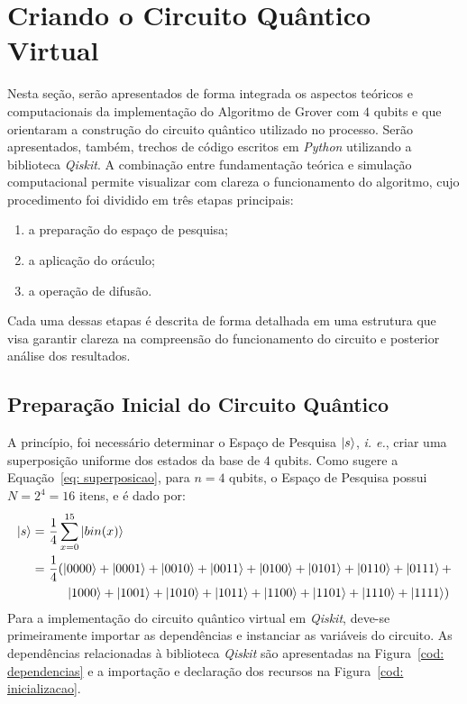 \section{Criando o Circuito Quântico Virtual}
\label{sec: circuitoVirtual}

Nesta seção, serão apresentados de forma integrada os aspectos teóricos e computacionais da implementação do Algoritmo de Grover com $4$ qubits e que orientaram a construção do circuito quântico utilizado no processo. Serão apresentados, também, trechos de código escritos em \emph{Python} utilizando a biblioteca \emph{Qiskit}. A combinação entre fundamentação teórica e simulação computacional permite visualizar com clareza o funcionamento do algoritmo, cujo procedimento foi dividido em três etapas principais:
\begin{enumerate}
    \item a preparação do espaço de pesquisa;
    \item a aplicação do oráculo;
    \item a operação de difusão.
\end{enumerate}

Cada uma dessas etapas é descrita de forma detalhada em uma estrutura que visa garantir clareza na compreensão do funcionamento do circuito e posterior análise dos resultados.

\subsection{Preparação Inicial do Circuito Quântico}
\label{subSec: preparacaoInicialTeo}

A princípio, foi necessário determinar o Espaço de Pesquisa $\ket{s}$, \emph{i. e.}, criar uma superposição uniforme dos estados da base de $4$ qubits. Como sugere a Equação~\ref{eq: superposicao}, para $n=4$ qubits, o Espaço de Pesquisa possui $N = 2^4 = 16$ itens, e é dado por:
%
\begin{align}
    \label{eq: espacoPesquisa}
    \notag
    \ket{s} =&~ \frac{1}{4} \sum_{x=0}^{15} \ket{bin(x)} \\
     =&~ \frac{1}{4} (\ket{0000} +  \ket{0001} +  \ket{0010} +  \ket{0011} +  \ket{0100} +  \ket{0101} +  \ket{0110} + \ket{0111} +  \\
    \notag{}
     &~~~~~\ket{1000} +  \ket{1001} +  \ket{1010} +  \ket{1011} +  \ket{1100} +  \ket{1101} +  \ket{1110} +  \ket{1111})
\end{align}
%
\tab\tab Para a implementação do circuito quântico virtual em \emph{Qiskit}, deve-se primeiramente importar as dependências e instanciar as variáveis do circuito. As dependências relacionadas à biblioteca \emph{Qiskit} são apresentadas na Figura~\ref{cod: dependencias} e a importação e declaração dos recursos na Figura~\ref{cod: inicializacao}.

